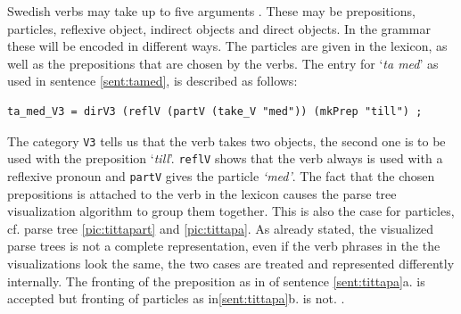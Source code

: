 \documentclass{report}
\begin{document}
Swedish verbs may take up to five arguments \cite[p. 53]{stymne}.
\label{sent:tamed}
These may be prepositions, particles, reflexive object, indirect objects and direct objects.
In the grammar these will be encoded in different ways. The particles are
given in the lexicon, as well as the prepositions that are chosen by the verbs.
The entry for `\emph{ta med}' as used in sentence \ref{sent:tamed}, is described as follows:
\begin{verbatim}
ta_med_V3 = dirV3 (reflV (partV (take_V "med")) (mkPrep "till") ;
\end{verbatim}
The category \verb-V3- tells us that the verb takes two objects, %
the second one is to be used with the preposition `\emph{till}'. \verb-reflV- shows
that the verb always is used with a reflexive
pronoun and \verb-partV- gives the particle \emph{`med'}.
The fact that the chosen prepositions is attached to the verb in the lexicon
causes the parse tree visualization algorithm to group them together.
This is also the case for particles, cf. parse tree \ref{pic:tittapart}
and \ref{pic:tittapa}.
As already stated, the visualized parse trees is not a complete representation,
even if the verb phrases in the the visualizations look the same, the two cases
are treated and represented differently internally. The fronting of the
preposition as in of sentence \ref{sent:tittapa}a. is accepted but
fronting of particles as in\ref{sent:tittapa}b. is not.
\label{sent:tittapa}.
\end{document}
